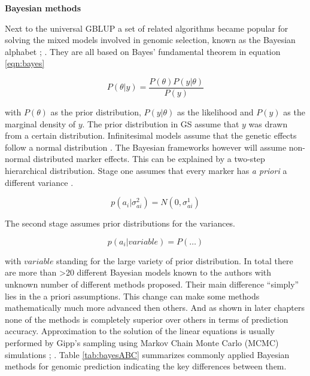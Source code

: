 \textbf{Bayesian methods} \newline 

Next to the universal GBLUP a set of related algorithms became popular for solving the mixed models involved in genomic selection, known as the Bayesian alphabet \cite{gianola2009}; \cite{gianola2013}. They are all based on Bayes' fundamental theorem in equation \ref{eqn:bayes}

\begin{equation}
P(\theta | y) = \frac{P(\theta )P(y | \theta)}{P(y)}  
\label{eqn:bayes}
\end{equation}

with $P(\theta )$ as the prior distribution, $P(y|\theta )$ as the likelihood and $P(y)$ as the marginal density of $y$. The prior distribution in GS assume that $y$ was drawn from a certain distribution. Infinitesimal models assume that the genetic effects follow a normal distribution \cite{legarra2018}. The Bayesian frameworks however will assume non-normal distributed marker effects. This can be explained by a two-step hierarchical distribution.
Stage one  assumes that every marker has \textit{a priori} a different variance \cite{legarra2018}.

\begin{equation}
p(a_i|\sigma_{ai}^2) = N (0,\sigma^1_{ai})
  \label{eqn:stageonbayes}
\end{equation}

The second stage assumes prior distributions for the variances.

\begin{equation}
p(a_i| variable ) = P(\dots )
  \label{eqn:stagetwobayes}
\end{equation}

with $variable$ standing for the large variety of prior distribution. In total there are more than >20
different Bayesian models known to the authors with unknown number of different methods proposed. Their main
difference ``simply'' lies in the a priori assumptions. This change can make some methods mathematically much
more advanced then others. And as shown in later chapters none of the methods is completely superior over
others in terms of prediction accuracy. Approximation to the solution of the linear equations is usually performed by Gipp's sampling using Markov Chain Monte Carlo (MCMC) simulations \cite{dlc2009}; \cite{BGLR}.
Table \ref{tab:bayesABC} summarizes commonly applied Bayesian methods for genomic prediction indicating the key differences between them. 

